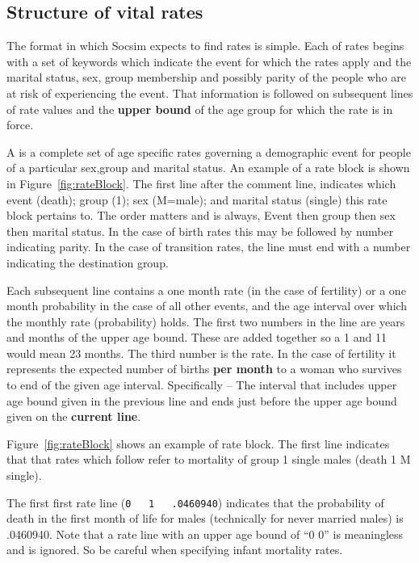 \subsection{Structure of vital rates}
\label{sec:vitalRates}

The format in which Socsim expects to find rates is simple. Each
 of rates begins with a set of keywords which indicate the
event for which the rates apply and the marital status, sex, group
membership and possibly parity of the people who are at risk of
experiencing the event.  That information is followed on subsequent
lines of rate values and the \textbf{upper bound} of the age group for which
the rate is in force.  

A  is a complete set of age specific rates governing a
demographic event for people of a particular sex,group and marital
status. An example of a rate block is shown in
Figure~\ref{fig:rateBlock}.  The first line after the comment line,
indicates which event (death); group (1); sex (M=male); and marital
status (single) this rate block pertains to. The order matters and is
always, Event then group then sex then marital status. In the case of
birth rates this may be followed by number indicating parity. In the
case of transition rates, the line must end with a number indicating
the destination group.

Each subsequent line contains a one month rate (in the case of
fertility) or a one month probability in the case of all other events,
and the age interval over which the monthly rate (probability) holds.  The
first two numbers in the line are years and months of the upper age
bound.  These are added together so a 1 and 11 would mean 23
months. The third number is the rate. In the case of fertility it
represents the expected number of births \textbf{per month} to a
woman who survives to end of the given age interval. Specifically -- The interval that includes  upper age bound given in the previous line and ends just before the upper age bound given on the \textbf{current line}.


Figure~\ref{fig:rateBlock} shows an example of rate block. The first line indicates that that rates which follow refer to mortality  of group 1 single males (death 1 M single).

The first first rate line (\verb|0   1   .0460940|) indicates that the probability of death in the first month of life for males (technically for never married males) is .0460940.  Note that a rate line with an upper age bound of ``0 0'' is meaningless and is ignored.  So be careful when specifying infant mortality rates.
 


